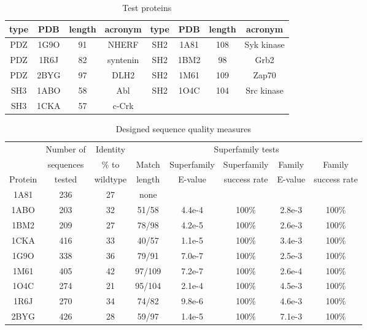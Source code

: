 \documentclass[a4paper,12pt]{article}
\begin{document}
\begin{table}[H]                            
\caption{Test proteins}
\label{tab:proteins}                      
\begin{center}
\begin{tabular}{cccccccc} \hline \hline  
type & PDB  & length & acronym  & type & PDB  & length & acronym \\ \hline
PDZ  & 1G9O &  91    & NHERF    & SH2  & 1A81 & 108    & Syk kinase \\ 
PDZ  & 1R6J &  82    & syntenin & SH2  & 1BM2 &  98    & Grb2       \\
PDZ  & 2BYG &  97    & DLH2     & SH2  & 1M61 & 109    & Zap70      \\
SH3  & 1ABO &  58    & Abl      & SH2  & 1O4C & 104    & Src kinase \\
SH3  & 1CKA &  57    & c-Crk    &      &      &        &     \\ \hline
\end{tabular}
\end{center}
\end{table}


\begin{table}[H]                            
\caption{Designed sequence quality measures}
\small
\label{tab:quality}                      
\begin{center}
\begin{tabular}{cccccccc} \hline \hline  
        & Number of & Identity & \multicolumn{5}{c}{\hrulefill Superfamily tests \hrulefill}   \\
        & sequences & \% to    & Match & Superfamily & Superfamily  & Family  & Family        \\
Protein & tested    & wildtype & length & E-value     & success rate & E-value & success rate  \\ \hline
1A81    & 236       & 27       & none   &             &              &         &               \\
1ABO    & 203       & 32       & 51/58  & 4.4e-4      & 100\%        & 2.8e-3  & 100\%         \\
1BM2    & 209       & 27       & 78/98  & 4.2e-5      & 100\%        & 2.6e-3  & 100\%         \\
1CKA    & 416       & 33       & 40/57  & 1.1e-5      & 100\%        & 3.4e-3  & 100\%         \\
1G9O    & 338       & 36       & 79/91  & 7.0e-7      & 100\%        & 2.5e-3  & 100\%         \\
1M61    & 405       & 42       & 97/109 & 7.2e-7      & 100\%        & 2.6e-4  & 100\%         \\
1O4C    & 274       & 21       & 95/104 & 2.1e-4      & 100\%        & 4.5e-3  & 100\%         \\
1R6J    & 270       & 34       & 74/82  & 9.8e-6      & 100\%        & 4.6e-3  & 100\%         \\
2BYG    & 426       & 28       & 59/97  & 1.4e-5      & 100\%        & 7.1e-3  & 100\%         \\ \hline
\end{tabular}
\end{center}
\end{table}
\end{document}
